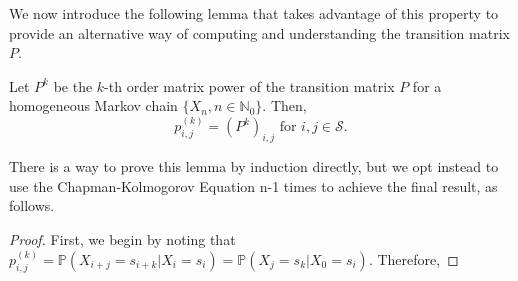 We now introduce the following lemma that takes advantage of this property to provide an alternative way of computing and understanding the transition matrix $P$. 

\begin{lemma}
	Let $P^k$ be the $k$-th order matrix power of the transition matrix $P$ for a homogeneous Markov chain $\{ X_n, n \in \mathbb{N}_0 \}$. Then, 
	\[ p_{i,j}^{(k)} = (P^k)_{i,j} \text{ for } i,j \in \mathcal{S}. \]
\end{lemma}

There is a way to prove this lemma by induction directly, but we opt instead to use the Chapman-Kolmogorov Equation n-1 times to achieve the final result, as follows. 

\begin{proof}
	First, we begin by noting that $p_{i,j}^{(k)} = \mathbb{P}(X_{i+j} = s_{i + k} | X_i = s_i) = \mathbb{P}(X_{j} = s_{k} | X_0 = s_i)$. Therefore, 
	
\end{proof}












